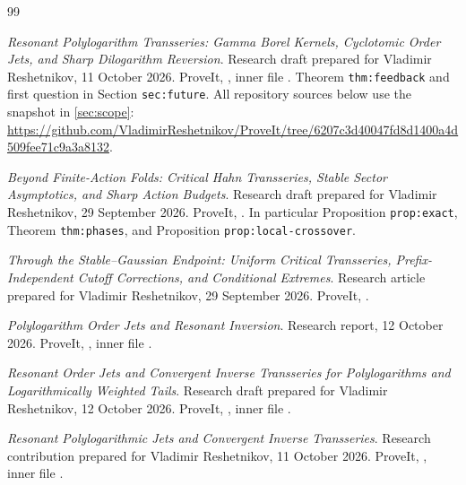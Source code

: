 \clearpage
\begin{thebibliography}{99}

\emph{Resonant Polylogarithm Transseries: Gamma Borel Kernels,
Cyclotomic Order Jets, and Sharp Dilogarithm Reversion}.
Research draft prepared for Vladimir Reshetnikov, 11 October 2026.
ProveIt, ,
inner file .
Theorem \texttt{thm:feedback} and first question in
Section \texttt{sec:future}. All repository sources below use the
snapshot in \cref{sec:scope}:
\url{https://github.com/VladimirReshetnikov/ProveIt/tree/6207c3d40047fd8d1400a4d509fee71c9a3a8132}.

\emph{Beyond Finite-Action Folds: Critical Hahn Transseries,
Stable Sector Asymptotics, and Sharp Action Budgets}.
Research draft prepared for Vladimir Reshetnikov, 29 September 2026.
ProveIt, .
In particular Proposition \texttt{prop:exact}, Theorem
\texttt{thm:phases}, and Proposition \texttt{prop:local-crossover}.

\emph{Through the Stable--Gaussian Endpoint: Uniform Critical
Transseries, Prefix-Independent Cutoff Corrections, and Conditional
Extremes}. Research article prepared for Vladimir Reshetnikov,
29 September 2026.
ProveIt, .

\emph{Polylogarithm Order Jets and Resonant Inversion}.
Research report, 12 October 2026.
ProveIt, ,
inner file .

\emph{Resonant Order Jets and Convergent Inverse Transseries for
Polylogarithms and Logarithmically Weighted Tails}.
Research draft prepared for Vladimir Reshetnikov, 12 October 2026.
ProveIt, ,
inner file .

\emph{Resonant Polylogarithmic Jets and Convergent Inverse Transseries}.
Research contribution prepared for Vladimir Reshetnikov, 11 October 2026.
ProveIt, ,
inner file .


\end{thebibliography}
